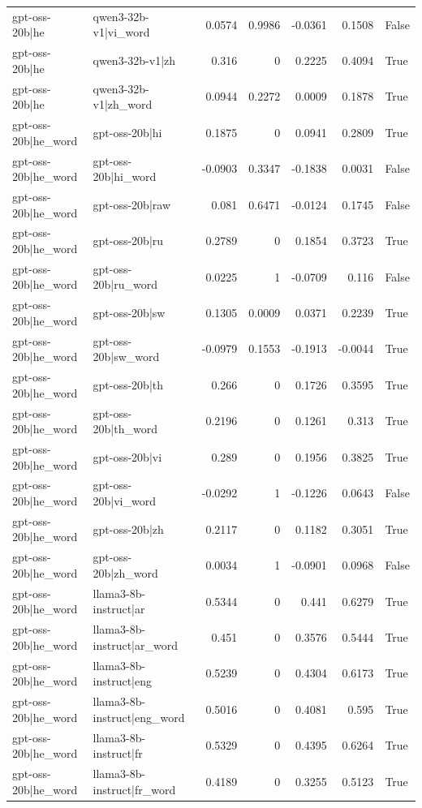 \begin{table}
\begin{tabular}{l l r r r r l}
gpt-oss-20b|he & qwen3-32b-v1|vi_word & 0.0574 & 0.9986 & -0.0361 & 0.1508 & False \\
gpt-oss-20b|he & qwen3-32b-v1|zh & 0.316 & 0 & 0.2225 & 0.4094 & True \\
gpt-oss-20b|he & qwen3-32b-v1|zh_word & 0.0944 & 0.2272 & 0.0009 & 0.1878 & True \\
gpt-oss-20b|he_word & gpt-oss-20b|hi & 0.1875 & 0 & 0.0941 & 0.2809 & True \\
gpt-oss-20b|he_word & gpt-oss-20b|hi_word & -0.0903 & 0.3347 & -0.1838 & 0.0031 & False \\
gpt-oss-20b|he_word & gpt-oss-20b|raw & 0.081 & 0.6471 & -0.0124 & 0.1745 & False \\
gpt-oss-20b|he_word & gpt-oss-20b|ru & 0.2789 & 0 & 0.1854 & 0.3723 & True \\
gpt-oss-20b|he_word & gpt-oss-20b|ru_word & 0.0225 & 1 & -0.0709 & 0.116 & False \\
gpt-oss-20b|he_word & gpt-oss-20b|sw & 0.1305 & 0.0009 & 0.0371 & 0.2239 & True \\
gpt-oss-20b|he_word & gpt-oss-20b|sw_word & -0.0979 & 0.1553 & -0.1913 & -0.0044 & True \\
gpt-oss-20b|he_word & gpt-oss-20b|th & 0.266 & 0 & 0.1726 & 0.3595 & True \\
gpt-oss-20b|he_word & gpt-oss-20b|th_word & 0.2196 & 0 & 0.1261 & 0.313 & True \\
gpt-oss-20b|he_word & gpt-oss-20b|vi & 0.289 & 0 & 0.1956 & 0.3825 & True \\
gpt-oss-20b|he_word & gpt-oss-20b|vi_word & -0.0292 & 1 & -0.1226 & 0.0643 & False \\
gpt-oss-20b|he_word & gpt-oss-20b|zh & 0.2117 & 0 & 0.1182 & 0.3051 & True \\
gpt-oss-20b|he_word & gpt-oss-20b|zh_word & 0.0034 & 1 & -0.0901 & 0.0968 & False \\
gpt-oss-20b|he_word & llama3-8b-instruct|ar & 0.5344 & 0 & 0.441 & 0.6279 & True \\
gpt-oss-20b|he_word & llama3-8b-instruct|ar_word & 0.451 & 0 & 0.3576 & 0.5444 & True \\
gpt-oss-20b|he_word & llama3-8b-instruct|eng & 0.5239 & 0 & 0.4304 & 0.6173 & True \\
gpt-oss-20b|he_word & llama3-8b-instruct|eng_word & 0.5016 & 0 & 0.4081 & 0.595 & True \\
gpt-oss-20b|he_word & llama3-8b-instruct|fr & 0.5329 & 0 & 0.4395 & 0.6264 & True \\
gpt-oss-20b|he_word & llama3-8b-instruct|fr_word & 0.4189 & 0 & 0.3255 & 0.5123 & True \\

\end{tabular}
\end{table}
